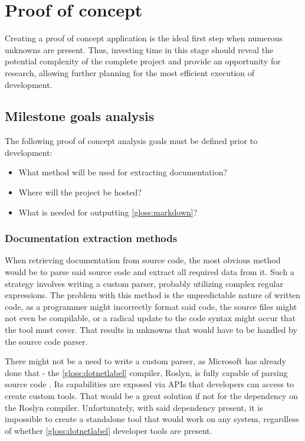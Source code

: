\chapter{Proof of concept} \label{chap:proofConcept}

Creating a proof of concept application is the ideal first step when numerous unknowns are present. Thus, investing time in this stage should reveal the potential complexity of the complete project and provide an opportunity for research, allowing further planning for the most efficient execution of development.

\section{Milestone goals analysis}

The following proof of concept analysis goals must be defined prior to development:
\begin{itemize}
    \item What method will be used for extracting documentation?
    \item Where will the project be hosted?
    \item What is needed for outputting \ref{gloss:markdown}?
\end{itemize}

\subsection{Documentation extraction methods}
When retrieving documentation from source code, the most obvious method would be to parse said source code and extract all required data from it. Such a strategy involves writing a custom parser, probably utilizing complex regular expressions. The problem with this method is the unpredictable nature of written code, as a programmer might incorrectly format said code, the source files might not even be compilable, or a radical update to the code syntax might occur that the tool must cover. That results in unknowns that would have to be handled by the source code parser.

There might not be a need to write a custom parser, as Microsoft has already done that - the \ref{gloss:dotnetlabel} compiler, Roslyn, is fully capable of parsing source code \cite{wagner_get_nodate}. Its capabilities are exposed via APIs that developers can access to create custom tools. That would be a great solution if not for the dependency on the Roslyn compiler. Unfortunately, with said dependency present, it is impossible to create a standalone tool that would work on any system, regardless of whether \ref{gloss:dotnetlabel} developer tools are present.

